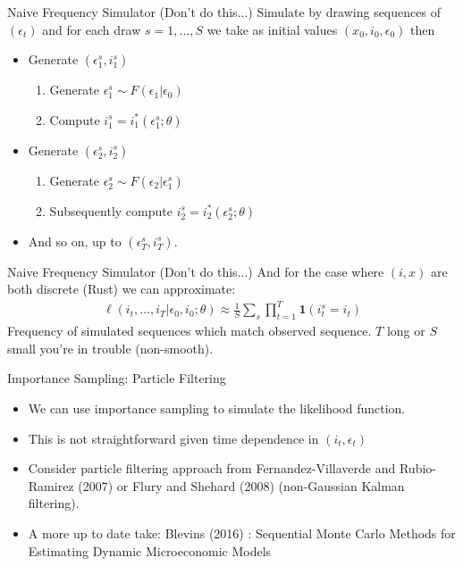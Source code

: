 \begin{frame}{Naive Frequency Simulator (Don't do this...)}
Simulate by drawing sequences of $(\epsilon_t)$ and for each draw $s=1,\ldots,S$ we take as initial values $(x_0,i_0,\epsilon_0)$ then
\begin{itemize}
\item Generate $(\epsilon_1^s, i_1^s)$
	\begin{enumerate}
	\item Generate $\epsilon_1^s \sim F(\epsilon_1 | \epsilon_0)$ 
	\item Compute $i_1^s = i_1^{*}(\epsilon_1^s; \theta)$
	\end{enumerate}
\item Generate $(\epsilon_2^s, i_2^s)$
	\begin{enumerate}
	\item Generate $\epsilon_2^s \sim F(\epsilon_2 | \epsilon_1^s)$ 
	\item Subsequently compute $i_2^s = i_2^{*}(\epsilon_2^s; \theta)$
	\end{enumerate}
\item And so on, up to $(\epsilon_T^s,i_T^s)$.
\end{itemize}
\end{frame}


\begin{frame}{Naive Frequency Simulator (Don't do this...)}
And for the case where $(i,x)$ are both discrete (Rust) we can approximate:
\vspace{-0.5cm}
\begin{eqnarray*}
\ell(i_t,\ldots,i_T | \epsilon_0,i_0;\theta) \approx \frac{1}{S} \sum_s \prod_{t=1}^T \symbf{1}(i_t^s = i_t)
\end{eqnarray*}
Frequency of simulated sequences which match observed sequence.  $T$ long or $S$ small you're in trouble (non-smooth).
\end{frame}



\begin{frame}{Importance Sampling: Particle Filtering}
\begin{itemize}
\item We can use importance sampling to simulate the likelihood function. 
\item This is not straightforward given time dependence in $(i_t,\epsilon_t)$
\item Consider particle filtering approach from Fernandez-Villaverde and Rubio-Ramirez (2007) or Flury and Shehard (2008) (non-Gaussian Kalman filtering).
\item A more up to date take: Blevins (2016) : Sequential {Monte Carlo} Methods for Estimating Dynamic Microeconomic Models
\end{itemize}
\end{frame}


